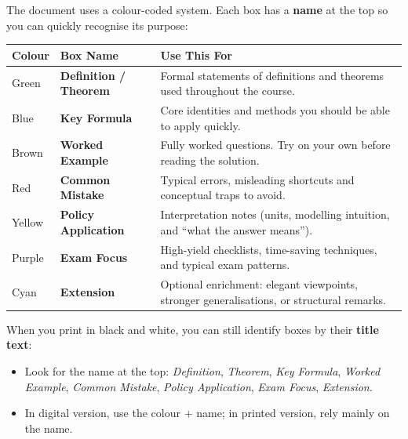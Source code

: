 \documentclass[12pt]{article}
\begin{document}
The document uses a colour-coded system. Each box has a \textbf{name} at the top so you can quickly recognise its purpose:

\begin{center}
\begin{tabular}{|l|l|p{7cm}|}
\hline
\textbf{Colour} & \textbf{Box Name} & \textbf{Use This For} \\
\hline
\colorbox{green!5}{Green} & \textbf{Definition / Theorem} & Formal statements of definitions and theorems used throughout the course. \\
\hline
\colorbox{blue!5}{Blue}   & \textbf{Key Formula}          & Core identities and methods you should be able to apply quickly. \\
\hline
\colorbox{brown!5}{Brown} & \textbf{Worked Example}       & Fully worked questions. Try on your own before reading the solution. \\
\hline
\colorbox{red!5}{Red}     & \textbf{Common Mistake}       & Typical errors, misleading shortcuts and conceptual traps to avoid. \\
\hline
\colorbox{yellow!10}{Yellow} & \textbf{Policy Application} & Interpretation notes (units, modelling intuition, and ``what the answer means''). \\
\hline
\colorbox{purple!5}{Purple} & \textbf{Exam Focus}          & High-yield checklists, time-saving techniques, and typical exam patterns. \\
\hline
\colorbox{cyan!5}{Cyan}   & \textbf{Extension}            & Optional enrichment: elegant viewpoints, stronger generalisations, or structural remarks. \\
\hline
\end{tabular}
\end{center}

\noindent
When you print in black and white, you can still identify boxes by their \textbf{title text}:
\begin{itemize}
    \item Look for the name at the top: \textit{Definition}, \textit{Theorem}, \textit{Key Formula}, \textit{Worked Example}, \textit{Common Mistake}, \textit{Policy Application}, \textit{Exam Focus}, \textit{Extension}.
    \item In digital version, use the colour + name; in printed version, rely mainly on the name.
\end{itemize}

\newpage

\end{document}
